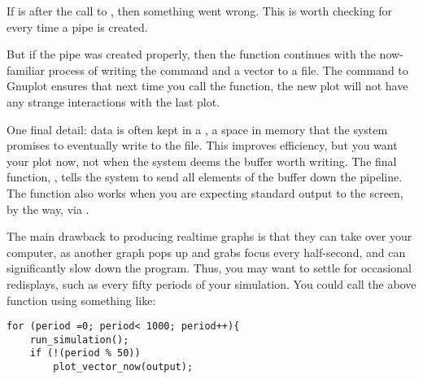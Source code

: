 If  is  after the call to , then something
went wrong.  This is worth checking for every time a pipe is created.

But if the pipe was created
properly, then the function continues with the now-familiar process of
writing the command  and a vector to a file. The 
command to Gnuplot ensures that next time you call the function, the new
plot will not have any strange interactions with the last plot.

One final detail: data is often kept in a , a space in
memory that the system promises to eventually write to the file. This
improves efficiency, but you want your plot now, not when the system
deems the buffer worth writing.  The final
function, , tells the system to send all elements of the
 buffer down the pipeline. The function also works when you are
expecting standard
output to the screen, by the way, via .

The main drawback to producing realtime graphs is that they can take over
your computer, as another graph pops up and grabs focus every half-second, and can significantly slow down the program.
Thus, you may want to settle for occasional redisplays, such as every
fifty periods of your simulation. You could call the above
function using something like:

\begin{lstlisting}
for (period =0; period< 1000; period++){
    run_simulation();
    if (!(period % 50))
        plot_vector_now(output);
\end{lstlisting}

